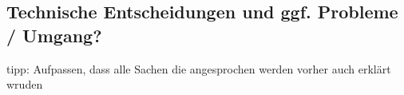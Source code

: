 \documentclass[
12pt]{scrreprt}
\begin{document}
    \subsection{Technische Entscheidungen und ggf. Probleme / Umgang?}


tipp: Aufpassen, dass alle Sachen die angesprochen werden vorher auch erklärt wruden
    
    
	
	
	

	
\end{document}
